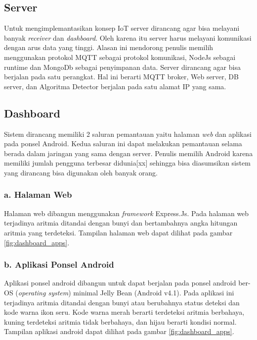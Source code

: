\subsection{Server}
Untuk mengimplemantasikan konsep IoT server dirancang agar bisa melayani banyak \textit{receiver} dan \textit{dashboard}. Oleh karena itu server harus melayani komunikasi dengan arus data yang tinggi. Alasan ini mendorong penulis memilih menggunakan protokol MQTT sebagai protokol komunikasi, NodeJs sebagai runtime dan MongoDb sebagai penyimpanan data. Server dirancang agar bisa berjalan pada satu perangkat. Hal ini berarti MQTT broker, Web server, DB server, dan Algoritma Detector berjalan pada satu alamat IP yang sama. 

\subsection{Dashboard}
Sistem dirancang memiliki 2 saluran pemantauan yaitu halaman \textit{web} dan aplikasi pada ponsel Android. Kedua saluran ini dapat melakukan pemantauan selama berada dalam jaringan yang sama dengan server. Penulis memilih Android karena memiliki jumlah pengguna terbesar didunia[xx] sehingga bisa diasumsikan sistem yang dirancang bisa digunakan oleh banyak orang.

\subsubsection{a. Halaman Web}
Halaman web dibangun menggunakan \textit{framework} Express.Js. Pada halaman web terjadinya aritmia ditandai dengan bunyi dan bertambahnya angka hitungan aritmia yang terdeteksi. Tampilan halaman web dapat dilihat pada gambar \ref{fig:dashboard_apps}.

\subsubsection{b. Aplikasi Ponsel Android}
Aplikasi ponsel android dibangun untuk dapat berjalan pada ponsel android ber-OS (\textit{operating system}) minimal Jelly Bean (Android v4.1). Pada aplikasi ini terjadinya aritmia ditandai dengan bunyi atau berubahnya status deteksi dan kode warna ikon seru. Kode warna merah berarti terdeteksi aritmia berbahaya, kuning terdeteksi aritmia tidak berbahaya, dan hijau berarti kondisi normal. Tampilan aplikasi android dapat dilihat pada gambar \ref{fig:dashboard_apps}.

